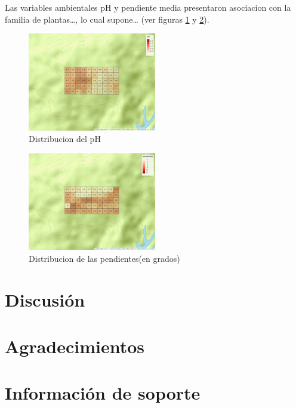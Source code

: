 \documentclass[11pt,]{article}
\begin{document}
Las variables ambientales pH y pendiente media presentaron asociacion
con la familia de plantas\ldots{}, lo cual supone\ldots{} (ver figuras
\ref{fig:mapa_cuadros_pH} y \ref{fig:mapa_cuadros_pendiente}).

\begin{figure}
\centering
\includegraphics[width=0.50000\textwidth]{mapa_cuadros_ph.png}
\caption{Distribucion del pH\label{fig:mapa_cuadros_pH}}
\end{figure}

\begin{figure}
\centering
\includegraphics[width=0.50000\textwidth]{mapa_cuadros_pendiente.png}
\caption{Distribucion de las pendientes(en
grados)\label{fig:mapa_cuadros_pendiente}}
\end{figure}

\section{Discusión}\label{discusiuxf3n}

\section{Agradecimientos}\label{agradecimientos}

\section{Información de soporte}\label{informaciuxf3n-de-soporte}
\end{document}
